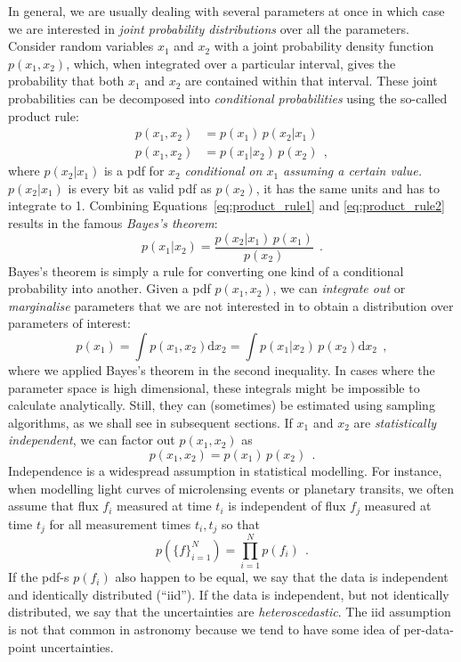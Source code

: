 \documentclass[12pt,dvipsnames]{report}
\newcommand{\hquad}{~~}
\begin{document}
In general, we are usually dealing with several parameters at once in which
case we are interested in \emph{joint probability distributions} over all the
parameters. Consider random variables $x_1$ and $x_2$ with a joint probability
density function $p(x_1,x_2)$, which, when integrated over a particular interval,
gives the probability that both $x_1$ and $x_2$ are contained within that
interval. These joint probabilities can be decomposed into \emph{conditional
    probabilities} using the so-called product rule:
\begin{align}
    p(x_1,x_2) & =p(x_1)\,p(x_2\lvert x_1) 
    \label{eq:product_rule1}
    \\
    p(x_1,x_2) & =p(x_1\lvert x_2)\,p(x_2)
    \hquad,
    \label{eq:product_rule2}
\end{align}
where $p(x_2\lvert x_1)$ is a pdf for $x_2$ \emph{conditional on
    $x_1$ assuming a certain value.} $p(x_2\lvert x_1)$ is every bit as
valid pdf as $p(x_2)$, it has the same units and has to integrate to 1.
Combining Equations~\ref{eq:product_rule1} and \ref{eq:product_rule2} results in the famous \emph{Bayes's theorem}:
\begin{equation}
    p(x_1\lvert x_2)= \frac{p(x_2\lvert x_1)\,p(x_1)}{p(x_2)}
    \hquad.
    \label{eq:bayes_theorem}
\end{equation}
Bayes's theorem is simply a rule for converting one kind of a conditional probability
into another.
Given a pdf $p(x_1,x_2)$, we can \emph{integrate out} or
\emph{marginalise} parameters that we are not interested in to obtain a distribution over
parameters of interest:
\begin{equation}
    p(x_1)=\int p(x_1,x_2)\textrm{d}x_2=\int p(x_1\lvert
    x_2)\,p(x_2)\textrm{d}x_2
    \hquad,
    \label{eq:marginalisation}
\end{equation}
where we applied Bayes's theorem in the second inequality.
In cases where the parameter space is high dimensional, these integrals might be
impossible to calculate analytically. Still, they can (sometimes) be estimated using sampling
algorithms, as we shall see in subsequent sections.
If $x_1$ and $x_2$ are \emph{statistically independent}, we can factor out $p(x_1,x_2)$ as
\begin{equation}
    p(x_1,x_2)=p(x_1)\,p(x_2)
    \hquad.
\end{equation}
Independence is a widespread assumption in statistical modelling. For instance, when modelling light curves
of microlensing events or planetary transits, we often assume that flux $f_i$ measured at time $t_i$ is independent
of flux $f_j$ measured at time $t_j$  for all measurement times $t_i,t_j$ so that
\begin{equation}
    p(\{f\}_{i=1}^N)=\prod_{i=1}^Np(f_i)
    \hquad.
    \label{eq:likelihood_indep}
\end{equation}
If the pdf-s $p(f_i)$ also happen to be equal, we say that the data is independent and
identically distributed (``iid''). If the data is independent, but not identically distributed,
we say that the uncertainties are \emph{heteroscedastic}.
The iid assumption is not that common in astronomy because we tend to have some idea of 
per-data-point uncertainties.
\end{document}

